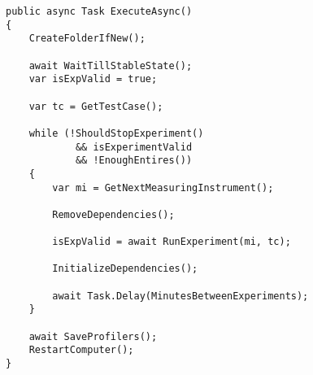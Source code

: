 
\begin{lstlisting}[caption=The method handeling dependencides and the validity of the results, label={lst:execute_async}]
public async Task ExecuteAsync()
{
    CreateFolderIfNew();

    await WaitTillStableState();
    var isExpValid = true;

    var tc = GetTestCase();

    while (!ShouldStopExperiment() 
            && isExperimentValid 
            && !EnoughEntires())
    {
        var mi = GetNextMeasuringInstrument();

        RemoveDependencies();

        isExpValid = await RunExperiment(mi, tc);

        InitializeDependencies();

        await Task.Delay(MinutesBetweenExperiments);
    }

    await SaveProfilers();
    RestartComputer();
}
\end{lstlisting}